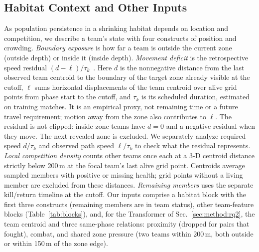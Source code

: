\documentclass[sigconf,anonymous,nonacm]{acmart}
\begin{document}
\subsection{Habitat Context and Other Inputs}
\label{sec:method:representation}
As population persistence in a shrinking habitat depends on location and competition, we describe a team's state with four constructs of position and crowding.
\emph{Boundary exposure} is how far a team is outside the current zone (outside depth) or inside it (inside depth).
\emph{Movement deficit} is the retrospective speed residual $(d-\ell)/\tau_k$~\cite{Nathan08}. Here $d$ is the nonnegative distance from the last observed team centroid to the boundary of the target zone already visible at the cutoff, $\ell$ sums horizontal displacements of the team centroid over alive grid points from phase start to the cutoff, and $\tau_k$ is its scheduled duration, estimated on training matches. It is an empirical proxy, not remaining time or a future travel requirement; motion away from the zone also contributes to $\ell$. The residual is not clipped: inside-zone teams have $d=0$ and a negative residual when they move. The next revealed zone is excluded. We separately analyze required speed $d/\tau_k$ and observed path speed $\ell/\tau_k$ to check what the residual represents.
\emph{Local competition density} counts other teams once each at a 3-D centroid distance strictly below 200\,m at the focal team's last alive grid point. Centroids average sampled members with positive or missing health; grid points without a living member are excluded from these distances. \emph{Remaining members} uses the separate kill/return timeline at the cutoff.
Our inputs comprise a habitat block with the first three constructs (remaining members are in team status), other team-feature blocks (Table~\ref{tab:blocks}), and, for the Transformer of Sec.~\ref{sec:method:rq2}, the team centroid and three same-phase relations: proximity (dropped for pairs that fought), combat, and shared zone pressure (two teams within 200\,m, both outside or within 150\,m of the zone edge).
\end{document}

